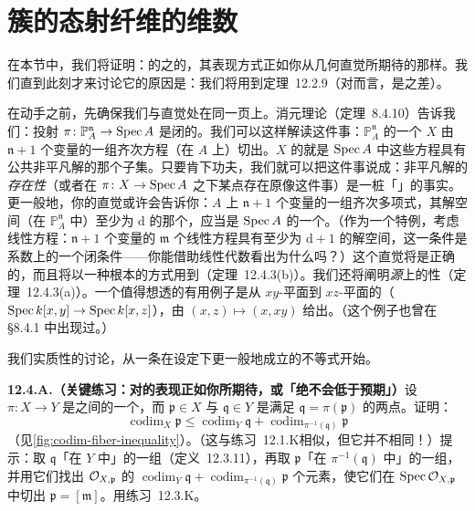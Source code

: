 
\section{簇的态射纤维的维数}

在本节中，我们将证明：\trVariety{}的\trMorphism{}之\trFiber{}的\trDimension，其表现方式正如你从几何直觉所期待的那样。我们直到此刻才来讨论它的原因是：我们将用到定理~12.2.9（对\trVariety{}而言，\trCodimension{}是\trDimension{}之差）。

在动手之前，先确保我们与直觉处在同一页上。消元理论（定理~8.4.10）告诉我们：投射 $\pi\colon\mathbb{P}^{\mathfrak{n}}_A\to\operatorname{Spec} A$ 是闭的。我们可以这样解读这件事：$\mathbb{P}^{\mathfrak{n}}_A$ 的一个\trClosedSubset{} $X$ 由 $\mathfrak{n}+1$ 个变量的一组齐次方程（在 $A$ 上）切出。$X$ 的\trImage{}就是 $\operatorname{Spec} A$ 中这些方程具有公共非平凡解的那个子集。只要肯下功夫，我们就可以把这件事说成：非平凡解的\emph{存在性}（或者在 $\pi\colon X\to\operatorname{Spec} A$ 之下某点存在原像这件事）是一桩「\trUpperSemicontinuous」的事实。更一般地，你的直觉或许会告诉你：$A$ 上 $\mathfrak{n}+1$ 个变量的一组齐次多项式，其解空间（在 $\mathbb{P}^{\mathfrak{n}}_A$ 中）\trDimension{}至少为 $\mathrm{d}$ 的那个\trLocus，应当是 $\operatorname{Spec} A$ 的一个\trClosedSubset。（作为一个特例，考虑线性方程：$\mathfrak{n}+1$ 个变量的 $\mathfrak{m}$ 个线性方程具有\trDimension{}至少为 $\mathrm{d}+1$ 的解空间，这一条件是系数上的一个闭条件——你能借助线性代数看出为什么吗？）这个直觉将是正确的，而且将以一种根本的方式用到\trProperness（定理~12.4.3(b)）。我们还将阐明\emph{源}上\trFiber\trDimension{}的\trUpperSemicontinuous{}性（定理~12.4.3(a)）。一个值得想透的有用例子是从 $xy$-平面到 $xz$-平面的\trMap（$\operatorname{Spec} k[x,y]\to\operatorname{Spec} k[x,z]$），由 $(x,z)\mapsto(x,xy)$ 给出。（这个例子也曾在 \S8.4.1 中出现过。）

我们实质性的讨论，从一条在\trLocally\trNoetherian{}设定下更一般地成立的不等式开始。

\textbf{12.4.A.（关键练习：\trCodimension{}对\trMorphism{}的表现正如你所期待，或「\trFiber\trDimension{}绝不会低于预期」）}\quad 设 $\pi\colon X\to Y$ 是\trLocally\trNoetherian{}\trScheme{}之间的一个\trMorphism，而 $\mathfrak{p}\in X$ 与 $\mathfrak{q}\in Y$ 是满足 $\mathfrak{q}=\pi(\mathfrak{p})$ 的两点。证明：
\[
\operatorname{codim}_X\mathfrak{p}\le\operatorname{codim}_Y\mathfrak{q}+\operatorname{codim}_{\pi^{-1}(\mathfrak{q})}\mathfrak{p}
\]
（见\cref{fig:codim-fiber-inequality}）。（这与\mbox{练习~12.1.K}相似，但它并不相同！）提示：取 $\mathfrak{q}$「在 $Y$ 中」的一组\trSystemOfParameters（定义~12.3.11），再取 $\mathfrak{p}$「在 $\pi^{-1}(\mathfrak{q})$ 中」的一组\trSystemOfParameters，并用它们找出 $\mathcal{O}_{X,\mathfrak{p}}$ 的 $\operatorname{codim}_Y\mathfrak{q}+\operatorname{codim}_{\pi^{-1}(\mathfrak{q})}\mathfrak{p}$ 个元素，使它们在 $\operatorname{Spec}\mathcal{O}_{X,\mathfrak{p}}$ 中切出 $\mathfrak{p}=[\mathfrak{m}]$。用\mbox{练习~12.3.K}。

